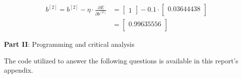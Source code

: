 \documentclass[12pt]{article}
\begin{document}
\begin{enumerate}[leftmargin=\labelsep]
        \begin{equation*}
          \begin{aligned}
            b^{[2]} = b^{[2]} - \eta \cdot \frac{\partial E}{\partial b^{[2]}}
             & = \begin{bmatrix}
                   1
                 \end{bmatrix} - 0.1 \cdot \begin{bmatrix}
                                             0.03644438 \\
                                           \end{bmatrix} \\
             & = \begin{bmatrix}
                   0.99635556 \\
                 \end{bmatrix}
          \end{aligned}
        \end{equation*}


\end{enumerate}

\pagebreak

\center\large{\textbf{Part II}: Programming and critical analysis}

\begin{justify}
  The code utilized to answer the following questions is available in this
  report's appendix.
\end{justify}
\end{document}
